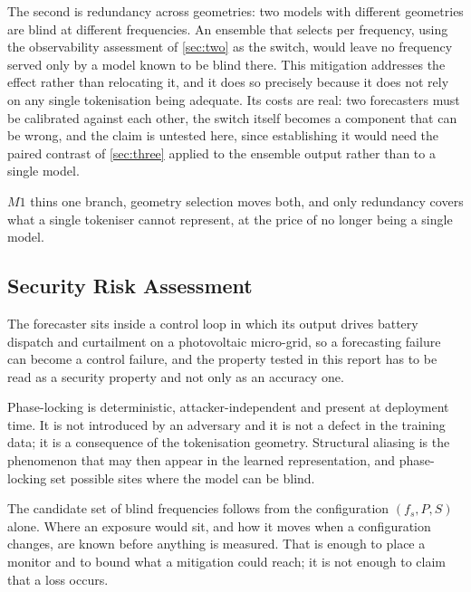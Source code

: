 The second is redundancy across geometries: two models with different geometries are blind at different frequencies. An ensemble that selects per frequency, using the observability assessment of \autoref{sec:two} as the switch, would leave no frequency served only by a model known to be blind there. This mitigation addresses the effect rather than relocating it, and it does so precisely because it does not rely on any single tokenisation being adequate. Its costs are real: two forecasters must be calibrated against each other, the switch itself becomes a component that can be wrong, and the claim is untested here, since establishing it would need the paired contrast of \autoref{sec:three} applied to the ensemble output rather than to a single model.

$M1$ thins one branch, geometry selection moves both, and only redundancy covers what a single tokeniser cannot represent, at the price of no longer being a single model.
\endgroup

\subsection{Security Risk Assessment}\label{sec:eight}
\begingroup
\let\subsection\subsubsection
The forecaster sits inside a control loop in which its output drives battery dispatch and curtailment on a photovoltaic micro-grid, so a forecasting failure can become a control failure, and the property tested in this report has to be read as a security property and not only as an accuracy one.

Phase-locking is deterministic, attacker-independent and present at deployment time. It is not introduced by an adversary and it is not a defect in the training data; it is a consequence of the tokenisation geometry. Structural aliasing is the phenomenon that may then appear in the learned representation, and phase-locking set possible sites where the model can be blind.

The candidate set of blind frequencies follows from the configuration $(f_s,P,S)$ alone. Where an exposure would sit, and how it moves when a configuration changes, are known before anything is measured. That is enough to place a monitor and to bound what a mitigation could reach; it is not enough to claim that a loss occurs.

